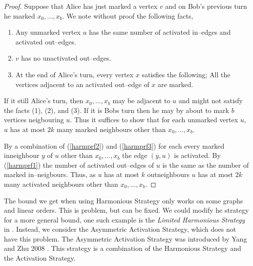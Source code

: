 \begin{proof}Suppose that Alice has just marked a vertex $v$ and on Bob's previous turn he marked $x_0,\dots,x_b$.
    We note without proof the following facts, 
    \begin{enumerate}[(1)]
        \item Any unmarked vertex $u$ has the same number of activated in--edges and activated out--edges. \label{harmprf1} 
        \item $v$ has no unactivated out--edges. \label{harmprf2}
        \item At the end of Alice's turn, every vertex $x$ satisfies the following; All the vertices adjacent to an activated out--edge of $x$ are marked. \label{harmprf3}
    \end{enumerate}
If it still Alice's turn, then $x_0,\dots,x_b$ may be adjacent to $u$ and might not satisfy the facts (1), (2), and (3). If it is Bobs turn then he may by about to mark $b$ vertices neigbouring $u$. Thus it suffices to show that for each unmarked vertex $u$, $u$ has at most $2k$ many marked neighbours other than $x_0,\dots,x_b$.

By a combination of (\ref{harmprf2}) and (\ref{harmprf3}) for each every marked inneighbour $y$  of $u$ other than $x_0,\dots,x_b$ the edge $(y,u)$ is activated. By (\ref{harmprf1}) the number of activated out--edges of $u$ is the same as the number of marked in--neigbours. Thus, as $u$ has at most $k$ outneighbours $u$ has at most $2k$ many activated neighbours other than $x_0,\dots,x_b$.
\end{proof}


The bound we get when using Harmonious Strategy only works on some graphs and linear orders. This is problem, but can be fixed. We could modify he strategy for a more general bound, one such example is the \textit{Limited Harmonious Strategy} in \cite{kierYang2005}. Instead, we consider the Asymmetric Activation Strategy, which does not have this problem. The Asymmetric Activation Strategy was introduced by Yang and Zhu 2008 \cite{yangZhu2008}. This strategy is a combination of the Harmonious Strategy and the Activation Strategy.

